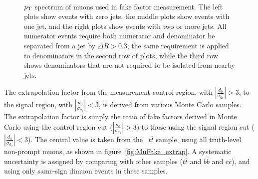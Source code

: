 \begin{figure}[h]
{  }\\

  \caption{\label{fig:MuFake_stacks}$p_{\text{T}}$ spectrum of muons used in fake factor measurement.  The left plots show events with zero jets, the middle
	plots show events with one jet, and the right plots show events with two or more jets.  All numerator events require both numerator and denominator be separated from a jet by $\Delta R > 0.3$; the same requirement is applied to denominators in the second row of plots, while the third row shows 
denominators that are not required to be isolated from nearby jets.}
\end{figure}


The extrapolation factor from the measurement control region, with $|\frac{d_0}{\sigma_{d_0}}|>3$, to the signal region, with $|\frac{d_0}{\sigma_{d_0}}|<3$, is derived from various Monte Carlo samples. The extrapolation factor is simply the ratio of fake factors derived in Monte Carlo using the control region cut ($|\frac{d_0}{\sigma_{d_0}}|>3$) to those using the signal region cut ($|\frac{d_0}{\sigma_{d_0}}|<3$). The central value is taken from the \powheg~$t\overline{t}$ sample, using all truth-level non-prompt muons, as shown in figure~\ref{fig:MuFake_extrap}. A systematic uncertainty is assigned by comparing with other samples (\mcatnlo $t\overline{t}$ and \pythiab $b\overline{b}$ and $c\overline{c}$), and using only same-sign dimuon events in these samples.  

